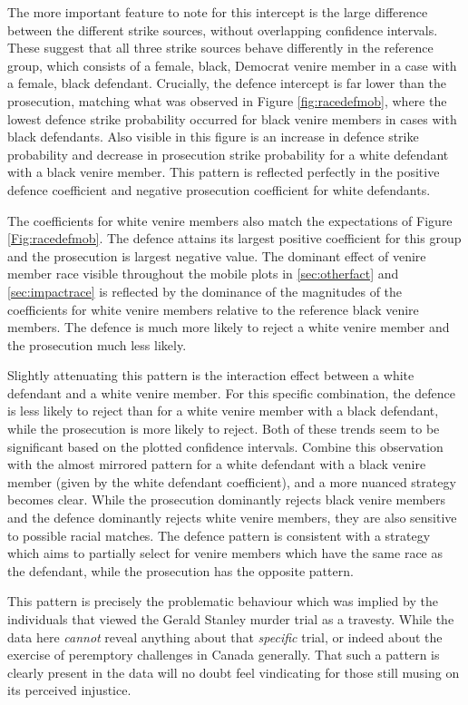The more important feature to note for this intercept is the large difference between the different strike sources, without
overlapping confidence intervals. These suggest that all three strike sources behave differently in the reference group, which
consists of a female, black, Democrat venire member in a case with a female, black defendant. Crucially, the defence intercept is
far lower than the prosecution, matching what was observed in Figure \ref{fig:racedefmob}, where the lowest defence strike
probability occurred for black venire members in cases with black defendants. Also visible in this figure is an increase in
defence strike probability and decrease in prosecution strike probability for a white defendant with a black venire member. This
pattern is reflected perfectly in the positive defence coefficient and negative prosecution coefficient for white defendants.

The coefficients for white venire members also match the expectations of Figure \ref{Fig:racedefmob}. The defence attains its
largest positive coefficient for this group and the prosecution is largest negative value. The dominant effect of venire member
race visible throughout the mobile plots in \ref{sec:otherfact} and \ref{sec:impactrace} is reflected by the dominance of the
magnitudes of the coefficients for white venire members relative to the reference black venire members. The defence is much more
likely to reject a white venire member and the prosecution much less likely.

Slightly attenuating this pattern is the interaction effect between a white defendant and a white venire member. For this specific
combination, the defence is less likely to reject than for a white venire member with a black defendant, while the prosecution is
more likely to reject. Both of these trends seem to be significant based on the plotted confidence intervals. Combine this
observation with the almost mirrored pattern for a white defendant with a black venire member (given by the white defendant
coefficient), and a more nuanced strategy becomes clear. While the prosecution dominantly rejects black venire members and the
defence dominantly rejects white venire members, they are also sensitive to possible racial matches. The defence pattern is
consistent with a strategy which aims to partially select for venire members which have the same race as the defendant, while the
prosecution has the opposite pattern.

This pattern is precisely the problematic behaviour which was implied by the individuals that viewed the Gerald Stanley murder
trial as a travesty. While the data here \textit{cannot} reveal anything about that \textit{specific} trial, or indeed about the
exercise of peremptory challenges in Canada generally. That such a pattern is clearly present in the data will no doubt feel
vindicating for those still musing on its perceived injustice.


